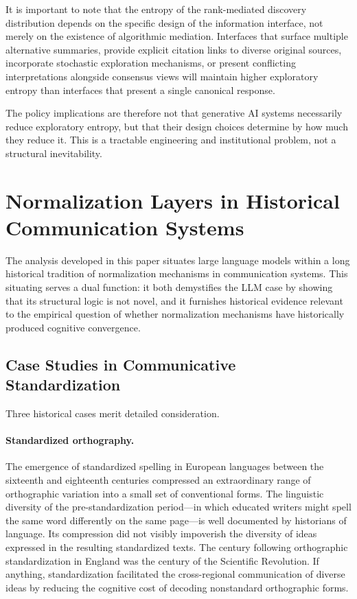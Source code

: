 \documentclass[12pt,a4paper]{article}
\theoremstyle{definition}
\theoremstyle{plain}
\theoremstyle{remark}
\begin{document}
It is important to note that the entropy of the rank-mediated discovery distribution depends
on the specific design of the information interface, not merely on the existence of
algorithmic mediation. Interfaces that surface multiple alternative summaries, provide
explicit citation links to diverse original sources, incorporate stochastic exploration
mechanisms, or present conflicting interpretations alongside consensus views will maintain
higher exploratory entropy than interfaces that present a single canonical response.

The policy implications are therefore not that generative AI systems necessarily reduce
exploratory entropy, but that their design choices determine by how much they reduce it.
This is a tractable engineering and institutional problem, not a structural inevitability.

\section{Normalization Layers in Historical Communication Systems}
\label{sec:historical}

The analysis developed in this paper situates large language models within a long historical
tradition of normalization mechanisms in communication systems. This situating serves a dual
function: it both demystifies the LLM case by showing that its structural logic is not
novel, and it furnishes historical evidence relevant to the empirical question of whether
normalization mechanisms have historically produced cognitive convergence.

\subsection{Case Studies in Communicative Standardization}

Three historical cases merit detailed consideration.

\paragraph{Standardized orthography.} The emergence of standardized spelling in European
languages between the sixteenth and eighteenth centuries compressed an extraordinary range of
orthographic variation into a small set of conventional forms. The linguistic diversity of
the pre-standardization period---in which educated writers might spell the same word
differently on the same page---is well documented by historians of language. Its compression
did not visibly impoverish the diversity of ideas expressed in the resulting standardized
texts. The century following orthographic standardization in England was the century of the
Scientific Revolution. If anything, standardization facilitated the cross-regional
communication of diverse ideas by reducing the cognitive cost of decoding nonstandard
orthographic forms.
\end{document}
